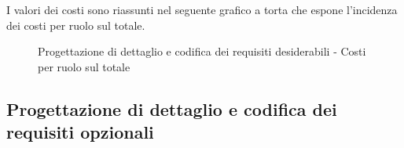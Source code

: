 				\noindent
				I valori dei costi sono riassunti nel seguente grafico a torta che espone l’incidenza dei costi per ruolo sul totale.
				\begin{center}
					\begin{figure}[htbp]
					\vspace{0.8cm}
					\caption{Progettazione di dettaglio e codifica dei requisiti desiderabili - Costi per ruolo sul totale}
					\end{figure}
				\end{center}
		
	\newpage
	\subsection{Progettazione di dettaglio e codifica dei requisiti opzionali} %
	\label{sub:progettazione_di_dettaglio_e_codifica_dei_requisiti_opzionali}
